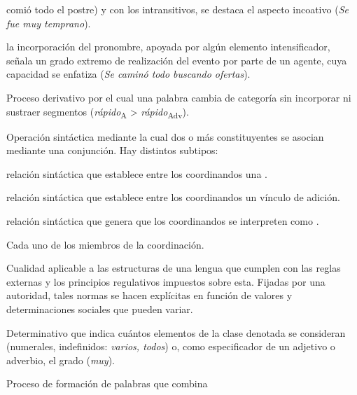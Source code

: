 \begin{glosariogeneral}
\begin{glosario}
\begin{glosario}
\begin{glosario}
{                    comió todo el postre}) y con los intransitivos, se destaca
                    el aspecto incoativo (\textit{Se fue muy temprano}).
              \item[de intensificación:] la incorporación del pronombre, apoyada
                    por algún elemento intensificador, señala un grado extremo
                    de realización del evento por parte de un agente, cuya
                    capacidad se enfatiza (\textit{Se caminó todo buscando
                    ofertas}).
            \end{glosario}
        \end{glosario}
    \end{glosario}
  \item[Conversión:] Proceso derivativo por el cual una palabra cambia de
        categoría sin incorporar ni sustraer segmentos (\textit{rápido}\textsubscript{A}
        > \textit{rápido}\textsubscript{Adv}).
  \item[Coordinación:] Operación sintáctica mediante la cual dos o más
        constituyentes se asocian mediante una conjunción. Hay distintos
        subtipos:
    \begin{glosario}
      \item[adversativa:] relación sintáctica que establece entre los
            coordinandos una .
      \item[copulativa:] relación sintáctica que establece entre los
            coordinandos un vínculo de adición.
      \item[disyuntiva:] relación sintáctica que genera que los coordinandos se
            interpreten como .
    \end{glosario}
  \item[Coordinando:] Cada uno de los miembros de la coordinación.
  \item[Corrección:] Cualidad aplicable a las estructuras de una lengua que
        cumplen con las reglas externas y los principios regulativos impuestos
        sobre esta. Fijadas por una autoridad, tales normas se hacen explícitas
        en función de valores y determinaciones sociales que pueden variar.
  \item[Cuantificador:] Determinativo que indica cuántos elementos de la clase
        denotada se consideran (numerales, indefinidos: \textit{varios, todos})
        o, como especificador de un adjetivo o adverbio, el grado (\textit{muy}).
  \item[Cruce léxico:] Proceso de formación de palabras que combina

\end{glosariogeneral}

